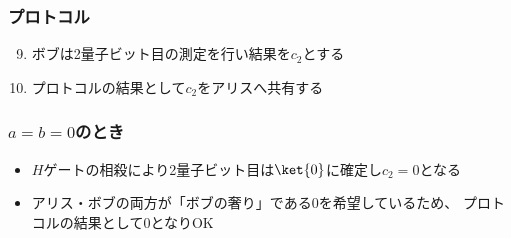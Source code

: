 \begin{frame}
  \frametitle{プロトコル}

  \begin{enumerate}
    \setcounter{enumi}{8}

    \item<+-> ボブは2量子ビット目の測定を行い結果を$c_2$とする
    \begin{figure}
    \end{figure}
    \label{enum:bob_measure_2nd_qubit}
    
    \item<+-> プロトコルの結果として$c_2$をアリスへ共有する
  \end{enumerate}

\end{frame}

\begin{frame}
  \frametitle{ $a = b = 0$のとき}

  \begin{figure}
  \end{figure}

  \begin{itemize}
    \item<+-> $H$ゲートの相殺により2量子ビット目は$\ket{0}$に確定し$c_2 = 0$となる
    
    \item<+-> アリス・ボブの両方が「ボブの奢り」である$0$を希望しているため、
    プロトコルの結果として$0$となりOK
  \end{itemize}
\end{frame}


